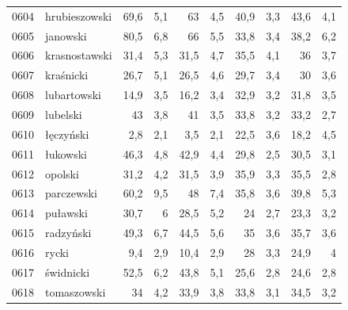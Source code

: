 \begin{center}
\begin{longtable}{lp{3cm}rrrrrrrr}
0604 & hrubieszowski           & 69,6    & 5,1         & 63       & 4,5          & 40,9     & 3,3          & 43,6     & 4,1          \\
0605 & janowski                & 80,5    & 6,8         & 66       & 5,5          & 33,8     & 3,4          & 38,2     & 6,2          \\
0606 & krasnostawski           & 31,4    & 5,3         & 31,5     & 4,7          & 35,5     & 4,1          & 36       & 3,7          \\
0607 & kraśnicki               & 26,7    & 5,1         & 26,5     & 4,6          & 29,7     & 3,4          & 30       & 3,6          \\
0608 & lubartowski             & 14,9    & 3,5         & 16,2     & 3,4          & 32,9     & 3,2          & 31,8     & 3,5          \\
0609 & lubelski                & 43      & 3,8         & 41       & 3,5          & 33,8     & 3,2          & 33,2     & 2,7          \\
0610 & łęczyński               & 2,8     & 2,1         & 3,5      & 2,1          & 22,5     & 3,6          & 18,2     & 4,5          \\
0611 & łukowski                & 46,3    & 4,8         & 42,9     & 4,4          & 29,8     & 2,5          & 30,5     & 3,1          \\
0612 & opolski                 & 31,2    & 4,2         & 31,5     & 3,9          & 35,9     & 3,3          & 35,5     & 2,8          \\
0613 & parczewski              & 60,2    & 9,5         & 48       & 7,4          & 35,8     & 3,6          & 39,8     & 5,3          \\
0614 & puławski                & 30,7    & 6           & 28,5     & 5,2          & 24       & 2,7          & 23,3     & 3,2          \\
0615 & radzyński               & 49,3    & 6,7         & 44,5     & 5,6          & 35       & 3,6          & 35,7     & 3,6          \\
0616 & rycki                   & 9,4     & 2,9         & 10,4     & 2,9          & 28       & 3,3          & 24,9     & 4            \\
0617 & świdnicki               & 52,5    & 6,2         & 43,8     & 5,1          & 25,6     & 2,8          & 24,6     & 2,8          \\
0618 & tomaszowski             & 34      & 4,2         & 33,9     & 3,8          & 33,8     & 3,1          & 34,5     & 3,2          \\

\end{longtable}
\end{center}
